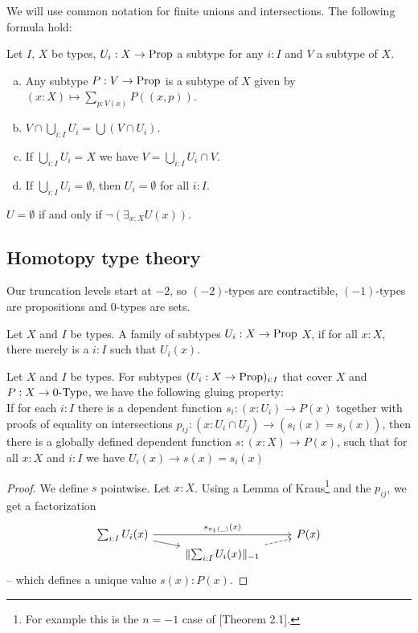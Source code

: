 We will use common notation for finite unions and intersections.
The following formula hold:

\begin{lemma}
  Let $I$, $X$ be types, $U_i:X\to\mathrm{Prop}$ a subtype for any $i:I$ and $V$ a subtype of $X$.
  \begin{enumerate}[(a)]
  \item Any subtype $P:V\to\mathrm{Prop}$ is a subtype of $X$ given by $(x:X)\mapsto\sum_{p:V(x)}P((x,p))$.
  \item $V\cap \bigcup_{i:I} U_i=\bigcup (V\cap U_i)$.
  \item If $\bigcup_{i:I}U_i=X$ we have $V=\bigcup_{i:I}U_i\cap V$.
  \item If $\bigcup_{i:I}U_i=\emptyset$, then $U_i=\emptyset$ for all $i:I$.
  \end{enumerate}
\end{lemma}

\begin{lemma}
  $U=\emptyset$ if and only if $\neg\left(\exists_{x:X}U(x)\right)$.
\end{lemma}

\subsection{Homotopy type theory}

Our truncation levels start at $-2$, so $(-2)$-types are contractible, $(-1)$-types are propositions and $0$-types are sets.

\begin{definition}%
  Let $X$ and $I$ be types.
  A family of subtypes $U_i:X\to\mathrm{Prop}$  $X$,
  if for all $x:X$, there merely is a $i:I$ such that $U_i(x)$.
\end{definition}

\begin{lemma}%
  \label{kraus-glueing}
  Let $X$ and $I$ be types.
  For subtypes $(U_i:X \to \mathrm{Prop})_{i:I}$ that cover $X$ and $P:X\to 0\mbox{-}\mathrm{Type}$, we have the following gluing property: \\
  If for each $i:I$ there is a dependent function $s_i:(x:U_i)\to P(x)$ together with
  proofs of equality on intersections $p_{ij}:(x:U_i\cap U_j)\to (s_i(x)=s_j(x))$,
  then there is a globally defined dependent function $s:(x:X) \to P(x)$,
  such that for all $x:X$ and $i:I$ we have $U_i(x) \to s(x)=s_i(x)$
\end{lemma}

\begin{proof}
  We define $s$ pointwise.
  Let $x:X$.
  Using a Lemma of Kraus\footnote{For example this is the $n=-1$ case of \cite{dagstuhl-kraus}[Theorem 2.1].}
  and the $p_{ij}$, we get a factorization
  \[ \begin{tikzcd}[row sep=0mm]
    \sum_{i:I} U_i(x) \ar[rr, "s_{\pi_1(\_)}(x)"]\ar[rd] & & P(x) \\
    & \propTrunc{\sum_{i:I} U_i(x)}_{-1}\ar[ru,dashed] &
  \end{tikzcd} \]
-- which defines a unique value $s(x):P(x)$.
\end{proof}

